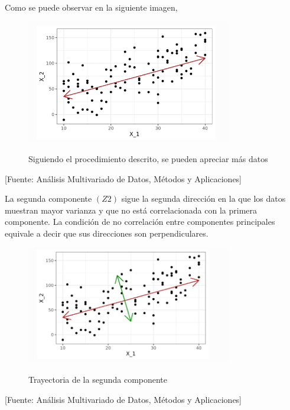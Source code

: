 Como se puede observar en la siguiente imagen,

 \begin{figure}[H]
        \centering
        \caption{Siguiendo el procedimiento descrito, se pueden apreciar más datos}
        \includegraphics[width=0.8\textwidth]{figures/interpretacionDatos.PNG}
        \label{ilustracion vector Z1 }
\end{figure}
\begin{center}
    [Fuente:  Análisis Multivariado de Datos, Métodos y Aplicaciones]\cite{interpretacion}
\end{center}

La segunda componente $(Z2)$ sigue la segunda dirección en la que los datos muestran mayor varianza y que no está correlacionada con la primera componente. La condición de no correlación entre componentes principales equivale a decir que sus direcciones son perpendiculares.


 \begin{figure}[H]
        \centering
        \caption{Trayectoria de la segunda componente}
        \includegraphics[width=0.8\textwidth]{figures/interpretacionDatos2.PNG}
        \label{ilustracion vector Z2 }
\end{figure}
\begin{center}
    [Fuente:  Análisis Multivariado de Datos, Métodos y Aplicaciones]\cite{interpretacion}
\end{center}


